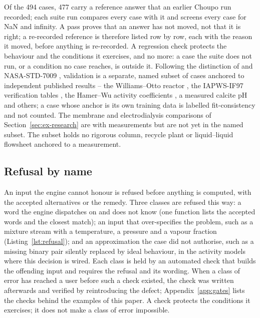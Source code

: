 \documentclass[preprint,12pt]{elsarticle}
\begin{document}
Of the 494 cases, 477 carry a reference answer that an earlier Choupo run
recorded; each suite run compares every case with it and screens every
case for NaN and infinity.  A pass proves that an answer has not moved,
not that it is right; a re-recorded reference is therefore listed row by
row, each with the reason it moved, before anything is re-recorded.  A
regression check protects the behaviour and the conditions it exercises,
and no more: a case the suite does not run, or a condition no case
reaches, is outside it.  Following the distinction of
\citet{oberkampf2010} and NASA-STD-7009 \citep{nasa7009}, validation is
a separate, named subset of cases anchored to independent published
results -- the Williams--Otto reactor \citep{williams1960}, the
IAPWS-IF97 verification tables \citep{wagner2000}, the Hamer--Wu
activity coefficients \citep{hamer1972}, a measured calcite pH
\citep{plummer1982} and others; a case whose anchor is its own training
data is labelled fit-consistency and not counted.  The membrane and
electrodialysis comparisons of Section~\ref{sec:ex-research} are with
measurements but are not yet in the named subset.  The subset holds no
rigorous column, recycle plant or liquid--liquid flowsheet anchored to a
measurement.

\subsection{Refusal by name}
\label{sec:vv-refusal}

An input the engine cannot honour is refused before anything is computed,
with the accepted alternatives or the remedy.  Three classes are refused
this way: a word the engine dispatches on and does not know (one function
lists the accepted words and the closest match); an input that
over-specifies the problem, such as a mixture stream with a temperature, a
pressure and a vapour fraction (Listing~\ref{lst:refusal}); and an
approximation the case did not authorise, such as a missing binary pair
silently replaced by ideal behaviour, in the activity models where this
decision is wired.  Each class is held by an automated check that builds
the offending input and requires the refusal and its wording.  When a
class of error has reached a user before such a check existed, the check
was written afterwards and verified by reintroducing the defect;
Appendix~\ref{app:gates} lists the checks behind the examples of this
paper.  A check protects the conditions it exercises; it does not make a
class of error impossible.
\end{document}
